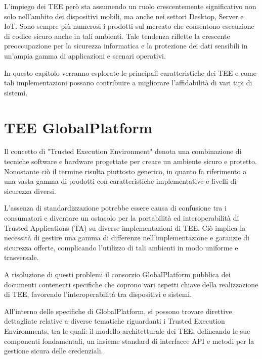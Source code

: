 \documentclass[12pt,italian]{report}
\begin{document}
	L'impiego dei TEE però sta assumendo un ruolo crescentemente significativo non solo nell'ambito dei dispositivi mobili, ma anche nei settori Desktop, Server e IoT. Sono sempre più numerosi i prodotti sul mercato che consentono esecuzione di codice sicuro anche in tali ambienti. Tale tendenza riflette la crescente preoccupazione per la sicurezza informatica e la protezione dei dati sensibili in un'ampia gamma di applicazioni e scenari operativi.
	
	In questo capitolo verranno esplorate le principali caratteristiche dei TEE e come tali implementazioni possano contribuire a migliorare l'affidabilità di vari tipi di sistemi.
	
	\newpage
	
	\section{TEE GlobalPlatform}
	\label{sec:GlobalPlatform}
	Il concetto di "Trusted Execution Environment" denota una combinazione di tecniche software e hardware progettate per creare un ambiente sicuro e protetto. Nonostante ciò il termine risulta piuttosto generico, in quanto fa riferimento a una vasta gamma di prodotti con caratteristiche implementative e livelli di sicurezza diversi.
	
	L'assenza di standardizzazione potrebbe essere causa di confusione tra i consumatori e diventare un ostacolo per la portabilità ed interoperabilità di Trusted Applications (TA) su diverse implementazioni di TEE. Ciò implica la necessità di gestire una gamma di differenze nell'implementazione e garanzie di sicurezza offerte, complicando l'utilizzo di tali ambienti in modo uniforme e trasversale.
	
	A risoluzione di questi problemi il consorzio GlobalPlatform pubblica dei documenti contenenti specifiche che coprono vari aspetti chiave della realizzazione di TEE, favorendo l'interoperabilità tra dispositivi e sistemi.
	
	All'interno delle specifiche di GlobalPlatform, si possono trovare direttive dettagliate relative a diverse tematiche riguardanti i Trusted Execution Environments, tra le quali: il modello architetturale dei TEE, delineando le sue componenti fondamentali, un insieme standard di interfacce API e metodi per la gestione sicura delle credenziali.
	
	\bigbreak
	
\end{document}
